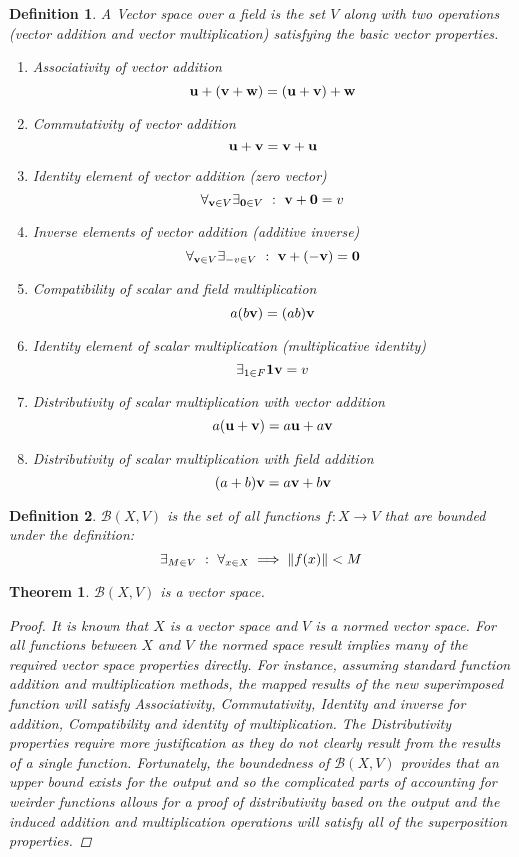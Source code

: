 \documentclass[]{article}
\newcommand{\st}{\ : \ }
\newtheorem{definition}{Definition}
\newtheorem{theorem}{Theorem}
\begin{document}
\begin{definition}
    A \emph{Vector space} over a field is the set $V$ along with two operations (vector addition and vector multiplication) satisfying the basic vector properties.
    \begin{enumerate}
        \item Associativity of vector addition
        \[\vb{u} + (\vb{v} + \vb{w}) = (\vb{u} + \vb{v}) + \vb{w}\]
        \item Commutativity of vector addition
        \[\vb{u} + \vb{v} = \vb{v} + \vb{u}\]
        \item Identity element of vector addition (zero vector)
        \[\forall_{\vb{v} \in V} \exists_{\vb{0} \in V} \st \vb{v} + \vb{0} = v \]
        \item Inverse elements of vector addition (additive inverse)
        \[\forall_{\vb{v} \in V} \exists_{-v \in V} \st \vb{v} + (-\vb{v}) = \vb{0}\]
        \item Compatibility of scalar and field multiplication
        \[a (b \vb{v}) = (a b) \vb{v}\]
        \item Identity element of scalar multiplication (multiplicative identity)
        \[\exists_{1 \in F} \vb{1} \vb{v} = v\]
        \item Distributivity of scalar multiplication with vector addition
        \[a (\vb{u} + \vb{v}) = a \vb{u} + a \vb{v}\]
        \item Distributivity of scalar multiplication with field addition
        \[(a + b) \vb{v} = a \vb{v} + b \vb{v}\]
    \end{enumerate}
\end{definition}

\begin{definition}
    $\mathcal{B}(X,V)$ is the set of all functions $f : X \to V$ that are bounded under the definition:
    \[\exists_{M \in V} \st \forall_{x\in X} \implies \norm{f(x)} < M\]
\end{definition}

\begin{theorem}
    $\mathcal{B}(X,V)$ is a vector space.
    \begin{proof}
        It is known that $X$ is a vector space and $V$ is a normed vector space.
        For all functions between $X$ and $V$ the normed space result implies many of the required vector space properties directly.
        For instance, assuming standard function addition and multiplication methods, the mapped results of the new superimposed function will satisfy Associativity, Commutativity, Identity and inverse for addition, Compatibility and identity of multiplication.
        The Distributivity properties require more justification as they do not clearly result from the results of a single function.
        Fortunately, the boundedness of $\mathcal{B}(X,V)$ provides that an upper bound exists for the output and so the complicated parts of accounting for weirder functions allows for a proof of distributivity based on the output and the induced addition and multiplication operations will satisfy all of the superposition properties.
    \end{proof}
\end{theorem}
\end{document}
